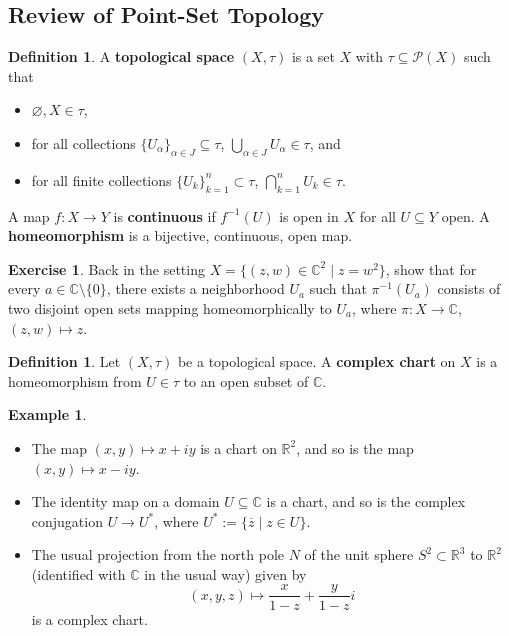 \documentclass[12pt]{article}
\newcommand{\cx}{\mathbb{C}}
\newcommand{\real}{\mathbb{R}}
\theoremstyle{definition}
\newtheorem{definition}[theorem]{Definition}
\newtheorem{example}[theorem]{Example}
\newtheorem{exercise}{Exercise}
\theoremstyle{remark}
\begin{document}
\subsection{Review of Point-Set Topology}
\begin{definition}
    A \textbf{topological space} $(X,\tau)$ is a set $X$ with $\tau\subseteq\mathcal{P}(X)$ such that 
    \begin{itemize}
        \item $\varnothing,X\in\tau$,
        \item for all collections $\{U_{\alpha}\}_{\alpha\in J}\subseteq\tau$, $\bigcup\limits_{\alpha\in J}U_{\alpha}\in\tau$, and
        \item for all finite collections $\{U_k\}_{k=1}^n\subset\tau$, $\bigcap\limits_{k=1}^nU_k\in\tau$.
    \end{itemize}
    A map $f:X\to Y$ is \textbf{continuous} if $f^{-1}(U)$ is open in $X$ for all $U\subseteq Y$ open. A \textbf{homeomorphism} is a bijective, continuous, open map.
\end{definition}
\begin{exercise}
    Back in the setting $X=\{(z,w)\in\cx^2\mid z=w^2\}$, show that for every $a\in\cx\setminus\{0\}$, there exists a neighborhood $U_a$ such that $\pi^{-1}(U_a)$ consists of two disjoint open sets mapping homeomorphically to $U_a$, where $\pi: X\to\cx$, $(z,w)\mapsto z$.
\end{exercise}
\begin{definition}
    Let $(X,\tau)$ be a topological space. A \textbf{complex chart} on $X$ is a homeomorphism from $U\in\tau$ to an open subset of $\cx$.
\end{definition}
\begin{example}
    \noindent
    \begin{itemize}
        \item The map $(x,y)\mapsto x+iy$ is a chart on $\real^2$, and so is the map $(x,y)\mapsto x-iy$.
        \item The identity map on a domain $U\subseteq\cx$ is a chart, and so is the complex conjugation $U\to U^*$, where $U^*:=\{\overline{z}\mid z\in U\}$.
        \item The usual projection from the north pole $N$ of the unit sphere $S^2\subset\real^3$ to $\real^2$ (identified with $\cx$ in the usual way) given by 
        \begin{equation}
            (x,y,z)\mapsto \frac{x}{1-z}+\frac{y}{1-z}i
        \end{equation}
        is a complex chart.
    \end{itemize}
\end{example}
\end{document}
